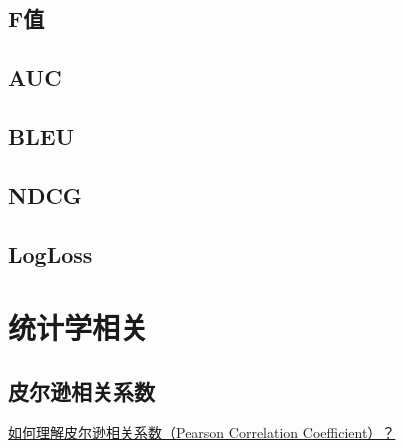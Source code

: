 \documentclass[10pt,a4paper]{ctexbook}
\begin{document}
\subsection{F值}
\subsection{AUC}
\subsection{BLEU}
\subsection{NDCG}
\subsection{LogLoss}

\section{统计学相关}
\subsection{皮尔逊相关系数}
\href{https://www.zhihu.com/question/19734616?sort=created}{如何理解皮尔逊相关系数（Pearson Correlation Coefficient）？}

\ifx\mlbook\undefined
    
\end{document}
